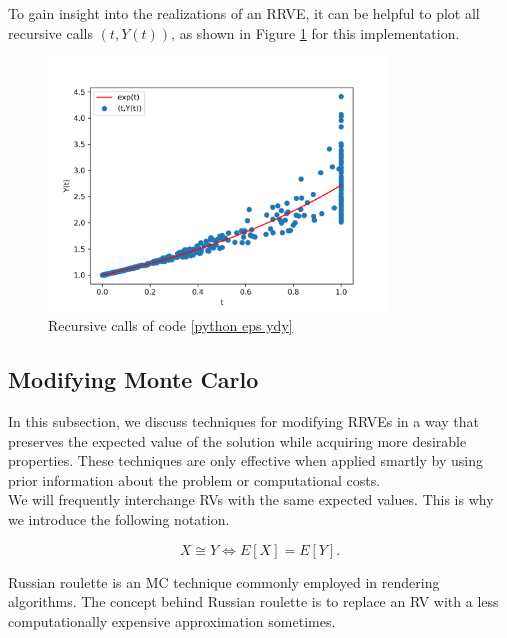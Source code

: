 \documentclass[a4paper,12pt]{article}
\begin{document}
\begin{pythonn} \label{python eps ydy}
    To gain insight into the realizations of an RRVE, it can be helpful to plot
    all recursive calls $(t,Y(t))$, as shown in Figure \ref{fig:intro example}
    for this implementation.

    \begin{figure}[h!]
        \centering
        \includegraphics[width=0.8\textwidth]{plots/intro example.png}
        \caption{Recursive calls of code \ref{python eps ydy}}
        \label{fig:intro example}
    \end{figure}
\end{pythonn}

\subsection{Modifying Monte Carlo}

In this subsection, we discuss techniques for modifying RRVEs
in a way that preserves the expected value of the solution while
acquiring more desirable properties. These techniques are only
effective when applied smartly by using prior information
about the problem or computational costs. \\

We will frequently interchange RVs with the same expected values.
This is why we introduce the following notation.
\begin{notation}[$\cong$]
    \[
        X \cong Y \iff E[X]=E[Y]
        .\]
\end{notation}

Russian roulette is an MC technique commonly employed in rendering algorithms.
The concept behind Russian roulette is to replace an RV with a
less computationally expensive approximation sometimes.
\end{document}
